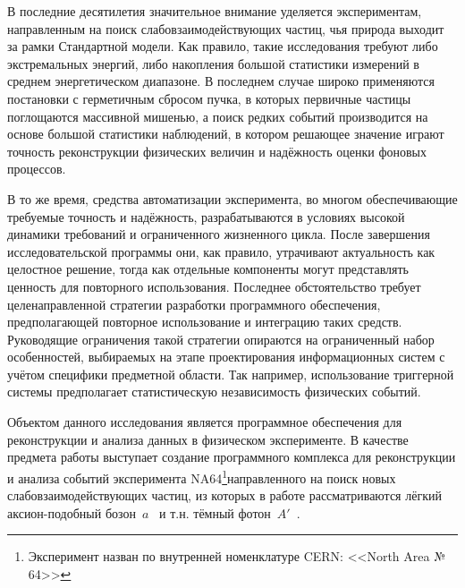 {\actuality} В последние десятилетия значительное внимание уделяется
экспериментам, направленным на поиск слабовзаимодействующих частиц,
чья природа выходит за рамки Стандартной модели. Как правило, такие
исследования требуют либо экстремальных энергий, либо накопления большой
статистики измерений в среднем энергетическом диапазоне. В последнем случае
широко применяются постановки с герметичным сбросом пучка, в которых
первичные частицы поглощаются массивной мишенью, а поиск редких событий
производится на основе большой статистики наблюдений, в котором решающее значение
играют точность реконструкции физических величин и надёжность оценки
фоновых процессов.

В то же время, средства автоматизации эксперимента,
во многом обеспечивающие требуемые точность и надёжность,
разрабатываются в условиях высокой динамики требований и
ограниченного жизненного цикла.
После завершения исследовательской программы они, как правило, утрачивают
актуальность как целостное решение, тогда как отдельные компоненты
могут представлять
ценность для повторного использования. Последнее обстоятельство
требует целенаправленной стратегии разработки программного обеспечения,
предполагающей повторное использование и интеграцию таких средств.
Руководящие ограничения такой стратегии опираются на ограниченный набор
особенностей, выбираемых на этапе проектирования информационных систем
с учётом специфики предметной области. Так например, использование триггерной
системы предполагает статистическую независимость физических
событий.

Объектом данного исследования является программное
обеспечения для реконструкции и анализа данных в физическом эксперименте.
В качестве предмета работы выступает создание
программного комплекса для реконструкции и анализа событий эксперимента
NA64\footnote{Эксперимент назван по внутренней номенклатуре CERN: <<North Area № 64>>}направленного
на поиск новых слабовзаимодействующих частиц,
из которых в работе рассматриваются
лёгкий аксион-подобный бозон~$a$~\cite{alps-PRD} и
т.н. тёмный фотон~$A'$~\cite{NA64-first-paper, DMG4-comphy-021}.

